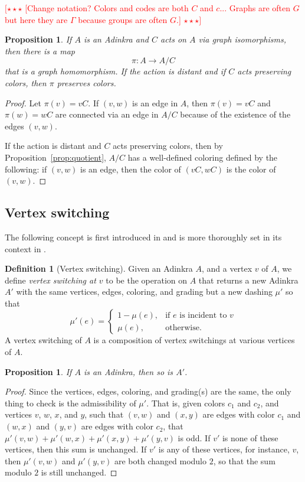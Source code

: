 \documentclass[12pt,twoside,singlespace]{article}
\numberwithin{equation}{section}
\newtheorem{prop}[equation]{Proposition}
\theoremstyle{definition}
\newtheorem{definition}[equation]{Definition}
\newcommand{\com}[1]{\textcolor{red}{$[\star \star \star$ #1 $\star \star \star]$}}
\begin{document}
\com{[Change notation?  Colors and codes are both $C$ and $c$...  Graphs are often $G$ but here they are $\Gamma$ because groups are often $G$.]}

\begin{prop}
If $A$ is an Adinkra and $C$ acts on $A$ via graph isomorphisms, then there is a map
\[\pi:A\to A/C\]
 that is a graph homomorphism.  If the action is distant and if $C$ acts preserving colors, then $\pi$ preserves colors.
\end{prop}
\begin{proof}
Let $\pi(v)=vC$.  If $(v,w)$ is an edge in $A$, then $\pi(v)=vC$ and $\pi(w)=wC$ are connected via an edge in $A/C$ because of the existence of the edges $(v,w)$.

If the action is distant and $C$ acts preserving colors, then by Proposition~\ref{prop:quotient}, $A/C$ has a well-defined coloring defined by the following: if $(v,w)$ is an edge, then the color of $(vC,wC)$ is the color of $(v,w)$.
\end{proof}




\subsection{Vertex switching}
The following concept is first introduced in \cite{} and is more thoroughly set in its context in \cite{Yan,cubicalcohomology}.

\begin{definition}[Vertex switching]
Given an Adinkra $A$, and a vertex $v$ of $A$, we define \emph{vertex switching at $v$} to be the operation on $A$ that returns a new Adinkra $A'$ with the same vertices, edges, coloring, and grading but a new dashing $\mu'$ so that
\begin{equation}
\mu'(e)=\begin{cases}
1-\mu(e),&\mbox{if $e$ is incident to $v$}\\
\mu(e),&\mbox{otherwise.}
\end{cases}
\end{equation}
A vertex switching of $A$ is a composition of vertex switchings at various vertices of $A$.
\end{definition}

\begin{prop}
\label{prop:switching-still-adinkra}
If $A$ is an Adinkra, then so is $A'$.
\end{prop}
\begin{proof}
Since the vertices, edges, coloring, and grading(s) are the same, the only thing to check is the admissibility of $\mu'$.  That is, given colors $c_1$ and $c_2$, and vertices $v$, $w$, $x$, and $y$, such that $(v,w)$ and $(x,y)$ are edges with color $c_1$ and $(w,x)$ and $(y,v)$ are edges with color $c_2$, that $\mu'(v,w)+\mu'(w,x)+\mu'(x,y)+\mu'(y,v)$ is odd.  If $v'$ is none of these vertices, then this sum is unchanged.  If $v'$ is any of these vertices, for instance, $v$, then $\mu'(v,w)$ and $\mu'(y,v)$ are both changed modulo $2$, so that the sum modulo $2$ is still unchanged.
\end{proof}
\end{document}
